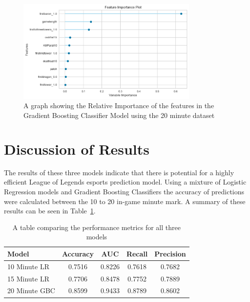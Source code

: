 \begin{figure}[h]
    \centering
    \includegraphics[width=0.8\textwidth]{figures/FeatureImport20}
    \caption{A graph showing the Relative Importance of the features in the Gradient Boosting Classifier Model using the 20 minute dataset}
    \label{fig:FeatureImport20}
\end{figure}


\section{Discussion of Results}\label{sec:discussion-of-results}

The results of these three models indicate that there is potential for a highly efficient League of Legends esports prediction model.
Using a mixture of Logistic Regression models and Gradient Boosting Classifiers the accuracy of predictions were calculated between the 10 to 20 in-game minute mark.
A summary of these results can be seen in Table~\ref{tab:ModelCompare}. \\

\begin{table}[h]
    \centering
    \caption{A table comparing the performance metrics for all three models}
    \begin{tabular}{lcccc}
        \toprule
        \textbf{Model} & \textbf{Accuracy} & \textbf{AUC} & \textbf{Recall} & \textbf{Precision} \\
        \midrule
        10 Minute LR & 0.7516 & 0.8226 & 0.7618 & 0.7682 \\
        15 Minute LR & 0.7706 & 0.8478 & 0.7752 & 0.7889 \\
        20 Minute GBC & 0.8599 & 0.9433 & 0.8789 & 0.8602 \\
        \bottomrule
    \end{tabular}
    \label{tab:ModelCompare}
\end{table}

